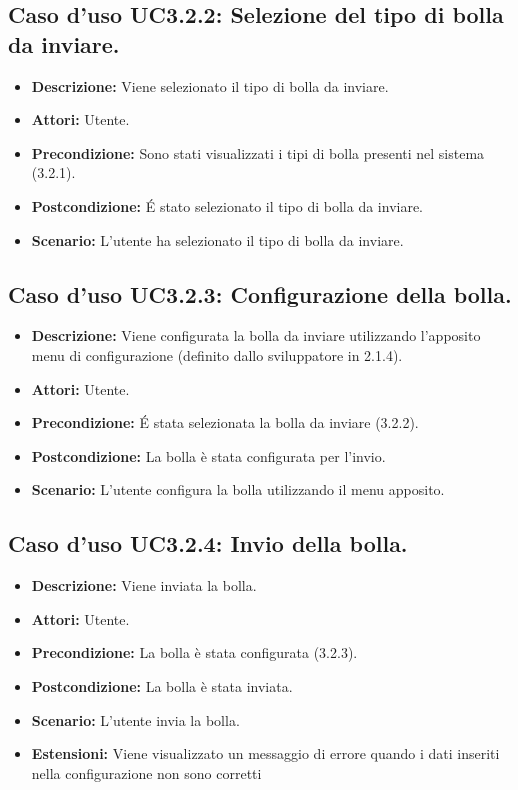 \subsection{Caso d'uso UC3.2.2: Selezione del tipo di bolla da inviare.}
\begin{itemize}
\item[]\textbf{Descrizione:} Viene selezionato il tipo di bolla da inviare.
\item[]\textbf{Attori:} Utente. 
\item[]\textbf{Precondizione:} Sono stati visualizzati i tipi di bolla presenti nel sistema (3.2.1). 
\item[]\textbf{Postcondizione:} \'E stato selezionato il tipo di bolla da inviare. 
\item[]\textbf{Scenario:}
L'utente ha selezionato il tipo di bolla da inviare. 
\end{itemize}

\subsection{Caso d'uso UC3.2.3: Configurazione della bolla.}
\begin{itemize}
\item[]\textbf{Descrizione:} Viene configurata la bolla da inviare utilizzando l'apposito menu di configurazione (definito dallo sviluppatore in 2.1.4).
\item[]\textbf{Attori:} Utente. 
\item[]\textbf{Precondizione:} \'E stata selezionata la bolla da inviare (3.2.2). 
\item[]\textbf{Postcondizione:} La bolla è stata configurata per l'invio. 
\item[]\textbf{Scenario:}
L'utente configura la bolla utilizzando il menu apposito. 
\end{itemize}

\subsection{Caso d'uso UC3.2.4: Invio della bolla.}
\begin{itemize}
\item[]\textbf{Descrizione:} Viene inviata la bolla.
\item[]\textbf{Attori:} Utente. 
\item[]\textbf{Precondizione:} La bolla è stata configurata (3.2.3). 
\item[]\textbf{Postcondizione:} La bolla è stata inviata. 
\item[]\textbf{Scenario:}
L'utente invia la bolla. 
\item[]\textbf{Estensioni:}
Viene visualizzato un messaggio di errore quando i dati inseriti nella configurazione non sono corretti 
\end{itemize}


